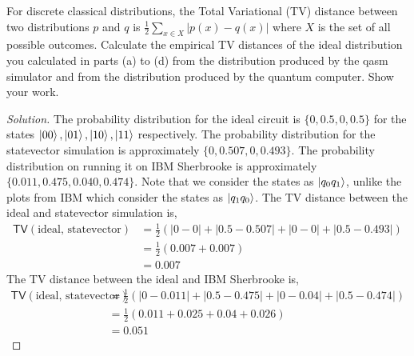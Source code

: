 \begin{solution}[label=ques:3g]
  \begin{question}
    For discrete classical distributions, the Total Variational (TV) distance between two distributions $p$ and $q$ is $\frac{1}{2}\sum_{x \in X} | p(x) - q(x)|$ where $X$ is the set of all possible outcomes. 
Calculate the empirical TV distances of the ideal distribution you calculated in parts (a) to (d) from the distribution produced by the qasm simulator and from the distribution produced by the quantum computer. Show your work.
  \end{question}
  \tcblower{}
  \begin{proof}[Solution]
    The probability distribution for the ideal circuit is $\{0, 0.5, 0, 0.5\}$ for the states $\ket{00}, \ket{01}, \ket{10}, \ket{11}$ respectively. The probability distribution for the statevector simulation is approximately $\{0, 0.507, 0, 0.493\}$. The probability distribution on running it on IBM Sherbrooke is approximately $\{0.011, 0.475, 0.040, 0.474\}$. Note that we consider the states as $\ket{q_0q_1}$, unlike the plots from IBM which consider the states as $\ket{q_1q_0}$. The TV distance between the ideal and statevector simulation is,
    \begin{equation}
      \begin{split}
      \mathsf{TV}(\text{ideal, statevector}) &= \frac{1}{2}\left(|0 - 0| + |0.5 - 0.507| + |0 - 0| + |0.5 - 0.493|\right)\\
      &= \frac{1}{2}(0.007 + 0.007)\\
      &= 0.007
      \end{split}
    \end{equation}
    The TV distance between the ideal and IBM Sherbrooke is,
    \begin{equation}
      \begin{split}
        \mathsf{TV}(\text{ideal, statevector}) &= \frac{1}{2}\left(|0 - 0.011| + |0.5 - 0.475| + |0 - 0.04| + |0.5 - 0.474|\right)\\
        &= \frac{1}{2}(0.011 + 0.025 + 0.04 + 0.026)\\
        &= 0.051
      \end{split}
    \end{equation}
  \end{proof}
\end{solution}
